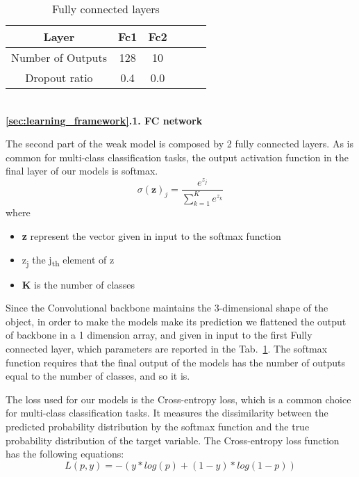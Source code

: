 \begin{table}[h]
    \centering
    \caption{Fully connected layers}
    \label{tab:fc-layers}
    \begin{tabular}{cccccc}
        \hline
        Layer & Fc1 & Fc2  \\
        \hline
        Number of Outputs & 128 & 10 \\
        Dropout ratio & 0.4 & 0.0   \\
        
        \hline
    \end{tabular}
\end{table}

\ \\
\textbf{\ref{sec:learning_framework}.1. FC network}

The second part of the weak model is composed by 2 fully connected layers. As is common for multi-class classification tasks, the output activation function in the final layer of our models is softmax.
\begin{equation}
    \sigma(\mathbf{z})_j = \frac{e^{z_j}}{\sum_{k=1}^{K}e^{z_k}}
\end{equation}
where
\begin{itemize}
    \item \textbf{z} represent the vector given in input to the softmax function
    \item z\textsubscript{j} the j\textsubscript{th} element of z
    \item \textbf{K} is the number of classes
\end{itemize}

Since the Convolutional backbone maintains the 3-dimensional shape of the object, in order to make the models make its prediction we flattened the output of backbone in a 1 dimension array, and given in input to the first Fully connected layer, which parameters are reported in the Tab.~\ref{tab:fc-layers}. The softmax function requires that the final output of the models has the number of outputs equal to the number of classes, and so it is.

The loss used for our models is the Cross-entropy loss, which is a common choice for multi-class classification tasks. It measures the dissimilarity between the predicted probability distribution by the softmax function and the true probability distribution of the target variable.
The Cross-entropy loss function has the following equations:
\begin{equation}
 L(p, y) = - (y * log(p) + (1 - y) * log(1 - p)) 
\end{equation}

